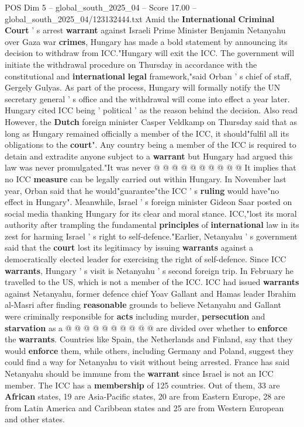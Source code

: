 \begin{textsample}{POS Dim 5 – global\_south\_2025\_04 – Score 17.00 – global\_south\_2025\_04/123132444.txt}  \label{ex:f5_pos_087}
Amid the \textbf{International} \textbf{Criminal} \textbf{Court} ' s arrest \textbf{warrant} against Israeli Prime Minister Benjamin Netanyahu over Gaza war \textbf{crimes}, Hungary has made a bold statement by announcing its decision to withdraw from ICC."Hungary will exit the ICC.
The government will initiate the withdrawal procedure on Thursday in accordance with the constitutional and \textbf{international} \textbf{legal} framework,"said Orban ' s chief of staff, Gergely Gulyas.
As part of the process, Hungary will formally notify the UN secretary general ' s office and the withdrawal will come into effect a year later.
Hungary cited ICC being ' political ' as the reason behind the decision.
Also read However, the \textbf{Dutch} foreign minister Casper Veldkamp on Thursday said that as long as Hungary remained officially a member of the ICC, it should"fulfil all its obligations to the \textbf{court}".
Any country being a member of the ICC is required to detain and extradite anyone subject to a \textbf{warrant} but Hungary had argued this law was never promulgated."It was never @ @ @ @ @ @ @ @ @ @ It implies that no ICC \textbf{measure} can be legally carried out within Hungary.
In November last year, Orban said that he would"guarantee"the ICC ' s \textbf{ruling} would have"no effect in Hungary".
Meanwhile, Israel ' s foreign minister Gideon Saar posted on social media thanking Hungary for its clear and moral stance.
ICC,"lost its moral authority after trampling the fundamental \textbf{principles} of \textbf{international} law in its zest for harming Israel ' s right to self-defence."Earlier, Netanyahu ' s government said that the \textbf{court} lost its legitimacy by issuing \textbf{warrants} against a democratically elected leader for exercising the right of self-defence.
Since ICC \textbf{warrants}, Hungary ' s visit is Netanyahu ' s second foreign trip.
In February he travelled to the US, which is not a member of the ICC.
ICC had issued \textbf{warrants} against Netanyahu, former defence chief Yoav Gallant and Hamas leader Ibrahim al-Masri after finding \textbf{reasonable} grounds to believe Netanyahu and Gallant were criminally responsible for \textbf{acts} including murder, \textbf{persecution} and \textbf{starvation} as a @ @ @ @ @ @ @ @ @ @ are divided over whether to \textbf{enforce} the \textbf{warrants}.
Countries like Spain, the Netherlands and Finland, say that they would \textbf{enforce} them, while others, including Germany and Poland, suggest they could find a way for Netanyahu to visit without being arrested.
France has said Netanyahu should be immune from the \textbf{warrant} since Israel is not an ICC member.
The ICC has a \textbf{membership} of 125 countries.
Out of them, 33 are \textbf{African} states, 19 are Asia-Pacific states, 20 are from Eastern Europe, 28 are from Latin America and Caribbean states and 25 are from Western European and other states.

\end{textsample}
